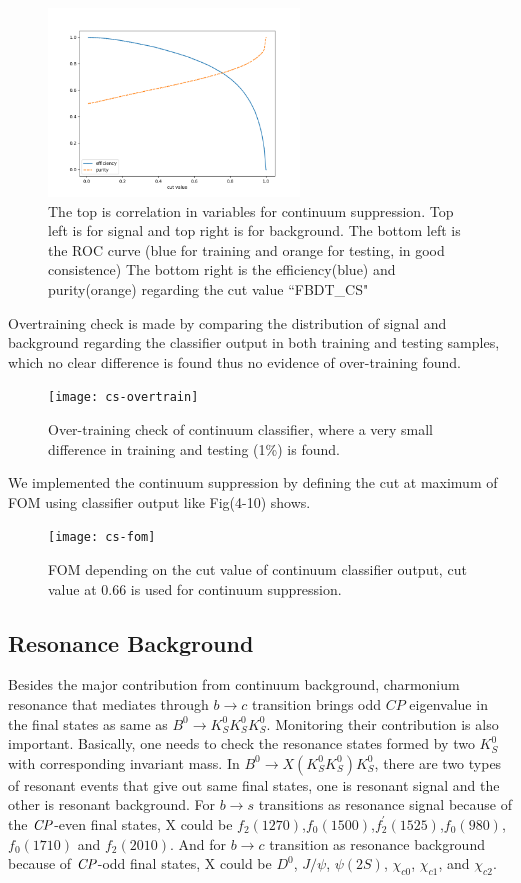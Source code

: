 \begin{figure}[H]
\begin{minipage}[b]{0.5\linewidth}
		\includegraphics[height=5cm]{figures/eff_CS}	
	\end{minipage}
	\caption{The top is correlation in variables for continuum suppression. Top left is for signal and top right is for background.
		The bottom left is the ROC curve (blue for training and orange for testing, in good consistence)
		The bottom right is the efficiency(blue) and purity(orange) regarding the cut value ``FBDT\_CS"}
	
\end{figure}

Overtraining check is made by comparing the distribution of signal and background regarding the classifier output in both training and testing samples, which no clear difference is found thus no evidence of over-training found.
\begin{figure}[H]
	\centering
	\texttt{[image: cs-overtrain]}
	\caption{Over-training check of continuum classifier, where a very small difference in training and testing (1\%) is found.}
\end{figure}

We implemented the continuum suppression by defining the cut at maximum of FOM using classifier output like Fig(4-10) shows. 
\begin{figure}[H]
	\centering
	\texttt{[image: cs-fom]}
	\caption{FOM depending on the cut value of continuum classifier output, cut value at 0.66 is used for continuum suppression. }
\end{figure}

\subsection{Resonance Background}
Besides the major contribution from continuum background, charmonium resonance that mediates through $b \to c$ transition brings odd $\textit{CP}$ eigenvalue in the final states as same as $B^0 \to K_S^0  K_S^0  K_S^0$. Monitoring their contribution is also important. Basically, one needs to check the resonance states formed by two $K_S^0$ with corresponding invariant mass. In $B^0 \to X(K_S^0 K_S^0) K_S^0$,  there are two types of resonant events that give out same final states, one is resonant signal and the other is resonant background. For $b \to s$ transitions as resonance signal because of the $\it{CP}$-even final states, X could be $f_2(1270)$,$f_0(1500)$,$f_{2}^{'}(1525)$,$f_0(980)$,$f_0(1710)$ and $f_2(2010)$. And for $b \to c$ transition as resonance background because of $\it{CP}$-odd final states, X could be $D^0$, $J/\psi$, $\psi(2S)$,  $\chi_{c0}$, $\chi_{c1}$, and $\chi_{c2}$.

